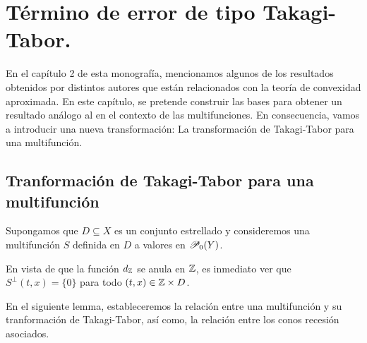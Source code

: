 \chapter{T\'ermino de error de tipo Takagi-Tabor.}

\setcounter{theorem}{0}

En el cap\'itulo 2 de esta monograf\'ia, mencionamos algunos de los 
resultados obtenidos por distintos autores que est\'an relacionados
con la teor\'ia de convexidad aproximada. En este cap\'itulo, se pretende
construir las bases para obtener un resultado an\'alogo al
 en el contexto de las multifunciones.
En consecuencia, vamos a introducir una nueva transformaci\'on:
La transformaci\'on de Takagi-Tabor para una multifunci\'on.

\section{Tranformaci\'on de Takagi-Tabor para una multifunci\'on}


Supongamos que $D\subseteq X$ es un conjunto estrellado
y consideremos una multifunci\'on $S$ definida en $D$ a valores
en $\P_0(Y)$. 


En vista de que la funci\'on $d_\Z$ se anula en $\Z$, es inmediato
ver que $S^\perp(t,x)=\{0\}$ para todo $(t,x)\in\Z\times D$.

En el siguiente lemma, estableceremos la relaci\'on entre una multifunci\'on
y su tranformaci\'on de Takagi-Tabor, as\'i como, la relaci\'on entre los
conos recesi\'on asociados.

